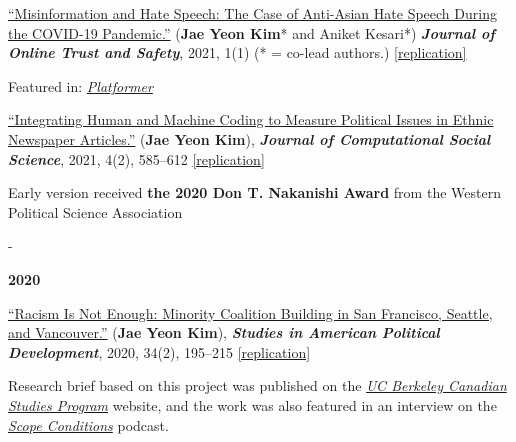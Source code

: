 \documentclass[10pt, letterpaper]{article}
\makeatletter
\newcommand{\needspace}[1]{%
  \par\penalty-100\begingroup
  \setlength{\dimen@}{#1}%
  \dimen@ii\pagegoal \advance\dimen@ii-\pagetotal
  \ifdim\dimen@>\dimen@ii \break\fi
  \endgroup
}
\newcommand{\pubyear}[1]{\needspace{6\baselineskip}\item[]\vspace{0.3\baselineskip}\textbf{#1}}
\renewenvironment{itemize}{
\begin{list}{}{
        \setlength{\leftmargin}{1.5em}
        \setlength{\itemsep}{0.10em}
        \setlength{\parskip}{0pt}
        \setlength{\parsep}{0.10em}
    }
}{
\end{list}
}
\makeatother
\begin{document}
\begin{etaremune}
\item \href{https://tsjournal.org/index.php/jots/article/view/13/5}{``Misinformation and Hate Speech: The Case of Anti-Asian Hate Speech During the COVID-19 Pandemic.''} (\textbf{Jae Yeon Kim}* and Aniket Kesari*) \textbf{\textit{Journal of Online Trust and Safety}}, 2021, 1(1) (* = co-lead authors.) \href{https://github.com/jaeyk/asian_hate_misinformation}{[replication]}
\begin{itemize}
    \item Featured in: \textit{\href{https://www.platformer.news/p/facebook-goes-meta?token=eyJ1c2VyX2lkIjozMzg0MTczNywicG9zdF9pZCI6NDMyMjkzNDMsIl8iOiJ2N2ZkbyIsImlhdCI6MTYzNTQ3MDYyMiwiZXhwIjoxNjM1NDc0MjIyLCJpc3MiOiJwdWItNzk3NiIsInN1YiI6InBvc3QtcmVhY3Rpb24ifQ.NatoanH3afQoMUpac4xFjQK2nAWPF83TupLcW_5bRVg}{Platformer}}
\end{itemize}

\item \href{https://link.springer.com/article/10.1007/s42001-020-00097-2}{``Integrating Human and Machine Coding to Measure Political Issues in Ethnic Newspaper Articles.''} (\textbf{Jae Yeon Kim}), \textbf{\textit{Journal of Computational Social Science}}, 2021, 4(2), 585--612 \href{https://github.com/jaeyk/content-analysis-for-evaluating-ML-performances}{[replication]}
\begin{itemize}
    \item Early version received \textbf{the 2020 Don T. Nakanishi Award} from the Western Political Science Association
\end{itemize}

\pubyear{2020}
\item \href{https://www.cambridge.org/core/journals/studies-in-american-political-development/article/racism-is-not-enough-minority-coalition-building-in-san-francisco-seattle-and-vancouver/7557642023E744D2E0FA68D800C8E08E}{``Racism Is Not Enough: Minority Coalition Building in San Francisco, Seattle, and Vancouver.''} (\textbf{Jae Yeon Kim}), \textbf{\textit{Studies in American Political Development}}, 2020, 34(2), 195--215 \href{https://github.com/jaeyk/analyzing-archival-data}{[replication]}
\begin{itemize}
    \item Research brief based on this project was published on the \textit{\href{https://canada.berkeley.edu/three-tales-chinatown-why-racism-not-enough-create-race-based-coalition-among-marginalized-groups}{UC Berkeley Canadian Studies Program}} website, and the work was also featured in an interview on the \textit{\href{https://www.scopeconditionspodcast.com/episodes/episode-34-comparing-asian-coalitions-across-three-chinatowns-with-jae-yeon-kim?fbclid=IwAR1_zGE57lmVDhg8uQA8FfDbdzOybB704Q2m0VQkkhfWtB7Asj29I_-mxPM}{Scope Conditions}} podcast.
\end{itemize}
\end{etaremune}
\end{document}
